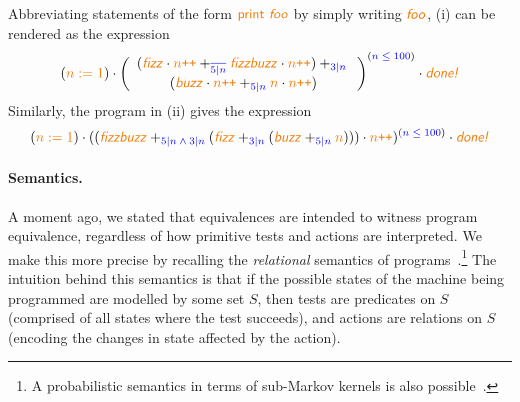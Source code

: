\documentclass[orivec,envcountsect,envcountsame]{llncs}
\begin{document}
    \begin{example}%
        \label{example:gkat-syntax-example}
        Abbreviating statements of the form \(\action{print \textsl{foo}}\) by simply writing \(\action{\textsl{foo}}\),
        (i) can be rendered as the \GKAT expression %
        \begin{equation}%
        \label{example-compressed-left}
        (\action{\(n := 1\)}) \cdot
            \left(
                \begin{array}{c}
                    ( \action{\textsl{fizz}} \cdot \action{\(n\)\texttt{++}} +_{\test{\(\overline{5|n}\)}} \action{\textsl{fizzbuzz}} \cdot \action{\(n\)\texttt{++}}) +_{\test{\(3|n\)}} {} \\
                    (\action{\textsl{buzz}} \cdot \action{\(n\)\texttt{++}} +_{\test{\(5|n\)}} \action{\(n\)} \cdot \action{\(n\)\texttt{++}})
                \end{array}
            \right)^{(\test{\(n \leq 100\)})}
            \cdot \action{\textsl{done!}}
        \end{equation}
        Similarly, the program in (ii) gives the \GKAT expression %
        \begin{equation}%
        \label{example-compressed-right}
            (\action{\(n := 1\)}) \cdot ( ( \action{\textsl{fizzbuzz}} +_{\test{\(5|n \wedge 3|n\)}} (\action{\textsl{fizz}} +_{\test{\(3|n\)}} (\action{\textsl{buzz}} +_{\test{\(5|n\)}} \action{\(n\)}))) \cdot \action{\(n\)\texttt{++}} )^{(\test{\(n \leq 100\)})} \cdot \action{\textsl{done!}}
        \end{equation}
    \end{example}


    \paragraph{\bf Semantics.}
    A moment ago, we stated that \GKAT equivalences are intended to witness program equivalence, regardless of how primitive tests and actions are interpreted.
    We make this more precise by recalling the \emph{relational} semantics of \GKAT programs~\cite{gkatpopl}.\footnote{A probabilistic semantics in terms of sub-Markov kernels is also possible~\cite{gkatpopl}.}
    The intuition behind this semantics is that if the possible states of the machine being programmed are modelled by some set $S$, then tests are predicates on $S$ (comprised of all states where the test succeeds), and actions are relations on $S$ (encoding the changes in state affected by the action).
\end{document}
